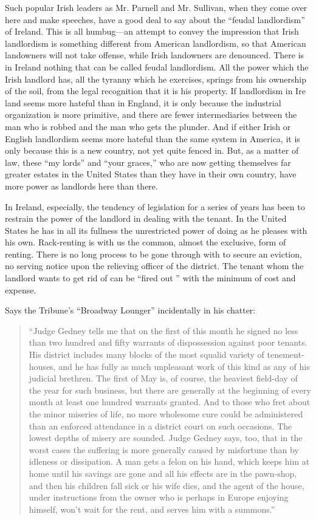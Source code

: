 \documentclass{book}
\begin{document}
Such popular Irish leaders as Mr. Parnell and Mr. Sullivan, when they come over here and make speeches, have a good deal to say about the “feudal landlordism” of Ireland. This is all humbug—an attempt to convey the impression that Irish landlordism is something different from American landlordism, so that American landowners will not take offense, while Irish landowners are denounced. There is in Ireland nothing that can be called feudal landlordism. All the power which the Irish landlord has, all the tyranny which he exercises, springs from his ownership of the soil, from the legal recognition that it is his property. If landlordism in Ire land seems more hateful than in England, it is only because the industrial organization is more primitive, and there are fewer intermediaries between the man who is robbed and the man who gets the plunder. And if either Irish or English landlordism seems more hateful than the same system in America, it is only because this is a new country, not yet quite fenced in. But, as a matter of law, these “my lords” and “your graces,” who are now getting themselves far greater estates in the United States than they have in their own country, have more power as landlords here than there.

In Ireland, especially, the tendency of legislation for a series of years has been to restrain the power of the landlord in dealing with the tenant. In the United States he has in all its fullness the unrestricted power of doing as he pleases with his own. Rack-renting is with us the common, almost the exclusive, form of renting. There is no long process to be gone through with to secure an eviction, no serving notice upon the relieving officer of the district. The tenant whom the landlord wants to get rid of can be “fired out ” with the minimum of cost and expense.

Says the Tribune’s “Broadway Lounger” incidentally in his chatter:

\begin{quotation}
	“Judge Gedney tells me that on the first of this month he signed no less than two hundred and fifty warrants of dispossession against poor tenants. His district includes many blocks of the most squalid variety of tenement-houses, and he has fully as much unpleasant work of this kind as any of his judicial brethren. The first of May is, of course, the heaviest field-day of the year for such business, but there are generally at the beginning of every month at least one hundred warrants granted. And to those who fret about the minor miseries of life, no more wholesome cure could be administered than an enforced attendance in a district court on such occasions. The lowest depths of misery are sounded. Judge Gedney says, too, that in the worst cases the suffering is more generally caused by misfortune than by idleness or dissipation. A man gets a felon on his hand, which keeps him at home until his savings are gone and all his effects are in the pawn-shop, and then his children fall sick or his wife dies, and the agent of the house, under instructions from the owner who is perhaps in Europe enjoying himself, won’t wait for the rent, and serves him with a summons.”
\end{quotation}
\end{document}

